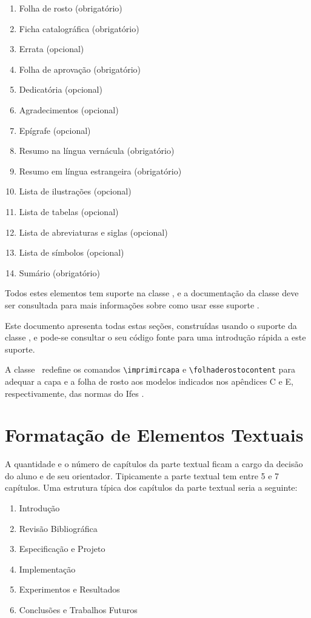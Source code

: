 \documentclass[times,english,brazilian,oneside,section=TITLE]{ifes8}
\begin{document}
\begin{enumerate}
\item Folha de rosto (obrigatório)
\item Ficha catalográfica (obrigatório)
\item Errata (opcional)
\item Folha de aprovação (obrigatório)
\item Dedicatória (opcional)
\item Agradecimentos (opcional)
\item Epígrafe (opcional)
\item Resumo na língua vernácula (obrigatório)
\item Resumo em língua estrangeira (obrigatório)
\item Lista de ilustrações (opcional)
\item Lista de tabelas (opcional)
\item Lista de abreviaturas e siglas (opcional)
\item Lista de símbolos (opcional)
\item Sumário (obrigatório)
\end{enumerate}

Todos estes elementos tem suporte na classe \abnTeX, e a documentação
da classe deve ser consultada para mais informações sobre como usar
esse suporte \cite{Araujo2016}.

Este documento apresenta todas estas seções, construídas usando o
suporte da classe \abnTeX, e pode-se consultar o seu código fonte para
uma introdução rápida a este suporte.

A classe \ifestex\ redefine os comandos \verb!\imprimircapa! e
\verb!\folhaderostocontent! para adequar a capa e a folha de rosto aos
modelos indicados nos apêndices C e E, respectivamente, das normas do
Ifes \cite{Ifes2024}.



\chapter{Formatação de Elementos Textuais}
\label{cha:format-text}

A quantidade e o número de capítulos da parte textual ficam a cargo da
decisão do aluno e de seu orientador. Tipicamente a parte textual tem
entre 5 e 7 capítulos. Uma estrutura típica dos capítulos da parte
textual seria a seguinte:

\begin{SingleSpace}
  \begin{enumerate}
  \item Introdução
  \item Revisão Bibliográfica
  \item Especificação e Projeto
  \item Implementação
  \item Experimentos e Resultados
  \item Conclusões e Trabalhos Futuros
  \end{enumerate}
\end{SingleSpace}
\end{document}
